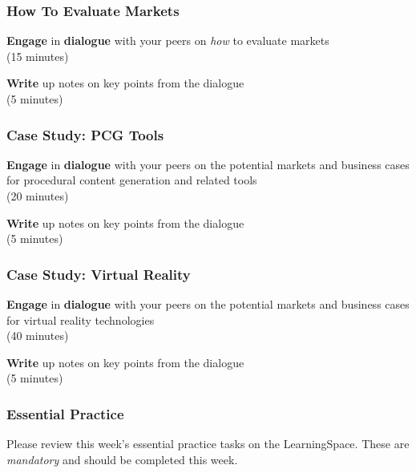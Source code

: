 \begin{frame}
	\frametitle{How To Evaluate Markets}
	
	\textbf{Engage} in \textbf{dialogue} with your peers on \textit{how} to evaluate markets \\
	(15 minutes)
	
	\vspace{2em}
	
	\textbf{Write} up notes on key points from the dialogue \\
	(5 minutes)
\end{frame}

\begin{frame}
	\frametitle{Case Study: PCG Tools}
	
	\textbf{Engage} in \textbf{dialogue} with your peers on the potential markets and business cases for procedural content generation and related tools \\
	(20 minutes)
	
	\vspace{2em}
	
	\textbf{Write} up notes on key points from the dialogue \\
	(5 minutes)
\end{frame}

\begin{frame}
	\frametitle{Case Study: Virtual Reality}
	
	\textbf{Engage} in \textbf{dialogue} with your peers on the potential markets and business cases for virtual reality technologies \\
	(40 minutes)
	
	\vspace{2em}
	
	\textbf{Write} up notes on key points from the dialogue \\
	(5 minutes)
\end{frame}

\begin{frame}
	\frametitle{Essential Practice}
	
	Please review this week's essential practice tasks on the LearningSpace. These are \textit{mandatory} and should be completed this week.
	
\end{frame}


